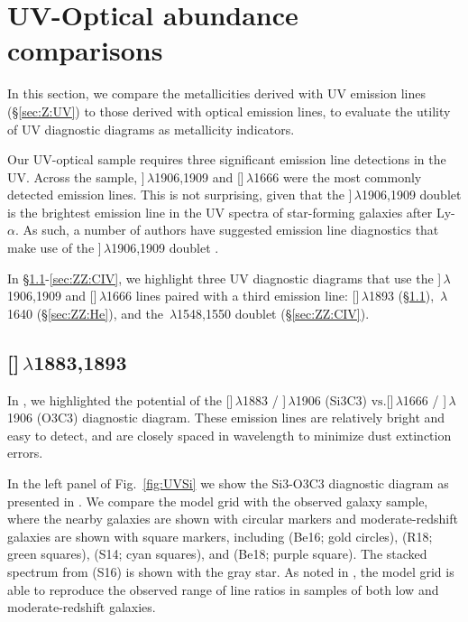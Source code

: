 \documentclass[preprint2]{aastex62}
\newcommand{\oiii}{[\ion{O}{3}]}
\newcommand{\heii}{\ion{He}{2}}
\newcommand{\civ}{\ion{C}{4}}
\newcommand{\SiuIII}{[\ion{Si}{3}]}
\newcommand{\ciii}{\ion{C}{3}]}
\newcommand\vs{\ensuremath{\mathrm{vs.}}\xspace}
\begin{document}
\section{UV-Optical abundance comparisons}\label{sec:ZZ}

In this section, we compare the metallicities derived with UV emission lines (\S\ref{sec:Z:UV}) to those derived with optical emission lines, to evaluate the utility of UV diagnostic diagrams as metallicity indicators.

Our UV-optical sample requires three significant emission line detections in the UV. Across the sample, \ciii$\,\lambda$1906,1909 and \oiii$\,\lambda$1666 were the most commonly detected emission lines. This is not surprising, given that the \ciii$\,\lambda$1906,1909 doublet is the brightest emission line in the UV spectra of star-forming galaxies after Ly-$\alpha$. As such, a number of authors have suggested emission line diagnostics that make use of the \ciii$\,\lambda$1906,1909 doublet \citep[e.g.,][]{Feltre+2016, Jaskot+2016, Byler+2018, Hirschmann+2019}.

In \S\ref{sec:ZZ:Si}-\ref{sec:ZZ:CIV}, we highlight three UV diagnostic diagrams that use the \ciii$\,\lambda$1906,1909 and \oiii$\,\lambda$1666 lines paired with a third emission line: \SiuIII$\,\lambda$1893 (\S\ref{sec:ZZ:Si}), \heii$\,\lambda$1640 (\S\ref{sec:ZZ:He}), and the \civ$\,\lambda$1548,1550 doublet (\S\ref{sec:ZZ:CIV}).

\subsection{\SiuIII$\,\lambda$1883,1893}\label{sec:ZZ:Si}

In , we highlighted the potential of the \SiuIII$\,\lambda$1883 / \ciii$\,\lambda$1906 (Si3C3) \vs \oiii$\,\lambda$1666 / \ciii$\,\lambda$1906 (O3C3) diagnostic diagram. These emission lines are relatively bright and easy to detect, and are closely spaced in wavelength to minimize dust extinction errors.

In the left panel of Fig.~\ref{fig:UVSi} we show the Si3-O3C3 diagnostic diagram as presented in . We compare the model grid with the observed galaxy sample, where the nearby galaxies are shown with circular markers and moderate-redshift galaxies are shown with square markers, including \citealt{Berg+2016} (Be16; gold circles), \citealt{Rigby+2018b} (R18; green squares), \citealt{Stark+2014} (S14; cyan squares), and \citealt{Berg+2018} (Be18; purple square). The stacked spectrum from \citealt{Steidel+2016} (S16) is shown with the gray star. As noted in , the model grid is able to reproduce the observed range of line ratios in samples of both low and moderate-redshift galaxies.
\end{document}
